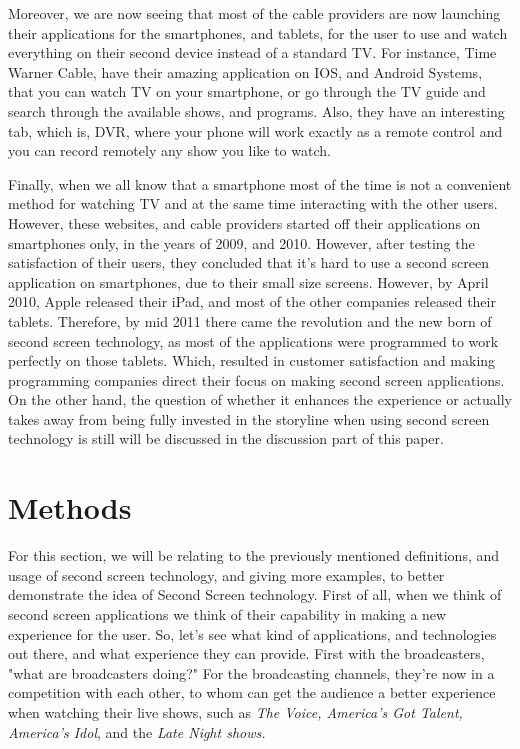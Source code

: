 \documentclass[12pt, oneside]{amsart}   	%
\begin{document}
Moreover, we are now seeing that most of the cable providers are now launching their applications for the smartphones, and tablets, for the user to use and watch everything on their second device instead of a standard TV.  For instance, Time Warner Cable, have their amazing application on IOS, and Android Systems, that you can watch TV on your smartphone, or go through the TV guide and search through the available shows, and programs.  Also, they have an interesting tab, which is, DVR, where your phone will work exactly as a remote control and you can record remotely any show you like to watch.  

 Finally, when we all know that a smartphone most of the time is not a convenient method for watching TV and at the same time interacting with the other users.  However, these websites, and cable providers started off their applications on smartphones only, in the years of 2009, and 2010.  However, after testing the satisfaction of their users, they concluded that it's hard to use a second screen application on smartphones, due to their small size screens.  However, by April 2010, Apple released their iPad, and most of the other companies released their tablets.  Therefore, by mid 2011 there came the revolution and the new born of second screen technology, as most of the applications were programmed to work perfectly on those tablets.  Which, resulted in customer satisfaction and making programming companies direct their focus on making second screen applications.  On the other hand, the question of whether it enhances the experience or actually takes away from being fully invested in the storyline when using second screen technology is still will be discussed in the discussion part of this paper.

 \section{Methods} 

For this section, we will be relating to the previously mentioned definitions, and usage of second screen technology, and giving more examples, to better demonstrate the idea of Second Screen technology. First of all, when we think of second screen applications we think of their capability in making a new experience for the user.  So, let's see what kind of applications, and technologies out there, and what experience they can provide.  First with the broadcasters, "what are broadcasters doing?" \cite{Second-Screen-Art}  For the broadcasting channels, they're now in a competition with each other, to whom can get the audience a better experience when watching their live shows, such as \emph{The Voice, America's Got Talent, America's Idol}, and the \emph{Late Night shows.}
\end{document}

